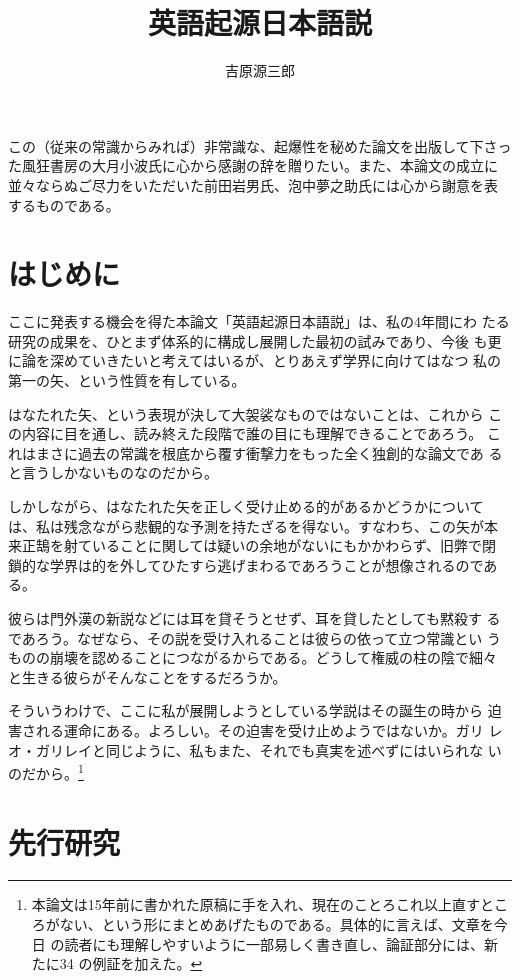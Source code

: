 ﻿\documentclass[11pt,twoside]{jreport}
\title{英語起源日本語説}
\author{吉原源三郎}
\begin{document}
\beforepreface


この（従来の常識からみれば）非常識な、起爆性を秘めた論文を出版して下さっ
た風狂書房の大月小波氏に心から感謝の辞を贈りたい。また、本論文の成立に
並々ならぬご尽力をいただいた前田岩男氏、泡中夢之助氏には心から謝意を表
するものである。

\afterpreface

\chapter{はじめに}

  ここに発表する機会を得た本論文「英語起源日本語説」は、私の4年間にわ
たる研究の成果を、ひとまず体系的に構成し展開した最初の試みであり、今後
も更に論を深めていきたいと考えてはいるが、とりあえず学界に向けてはなつ
私の第一の矢、という性質を有している。

  はなたれた矢、という表現が決して大袈裟なものではないことは、これから
この内容に目を通し、読み終えた段階で誰の目にも理解できることであろう。
これはまさに過去の常識を根底から覆す衝撃力をもった全く独創的な論文であ
ると言うしかないものなのだから。

  しかしながら、はなたれた矢を正しく受け止める的があるかどうかについて
は、私は残念ながら悲観的な予測を持たざるを得ない。すなわち、この矢が本
来正鵠を射ていることに関しては疑いの余地がないにもかかわらず、旧弊で閉
鎖的な学界は的を外してひたすら逃げまわるであろうことが想像されるのであ
る。

  彼らは門外漢の新説などには耳を貸そうとせず、耳を貸したとしても黙殺す
るであろう。なぜなら、その説を受け入れることは彼らの依って立つ常識とい
うものの崩壊を認めることにつながるからである。どうして権威の柱の陰で細々
と生きる彼らがそんなことをするだろうか。

  そういうわけで、ここに私が展開しようとしている学説はその誕生の時から
迫害される運命にある。よろしい。その迫害を受け止めようではないか。ガリ
レオ・ガリレイと同じように、私もまた、それでも真実を述べずにはいられな
いのだから。\footnote{
本論文は15年前に書かれた原稿に手を入れ、現在のことろこれ以上直すとこ
ろがない、という形にまとめあげたものである。具体的に言えば、文章を今日
の読者にも理解しやすいように一部易しく書き直し、論証部分には、新たに34
の例証を加えた。
} %

\chapter{先行研究}
\end{document}
